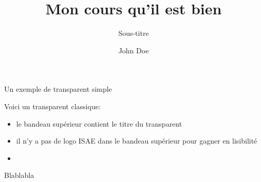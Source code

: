 \documentclass{beamer}
\begin{document}
\title[Petit titre]{Mon cours qu'il est bien}
\subtitle{Sous-titre}
\author{John Doe}
\subject{Slides to present my beamer class for ISAE slides.}
\date{}

\begin{frame}
  \titlepage
\end{frame}


\begin{frame}{Un exemple de transparent simple}

\vfill

Voici un transparent classique:

\begin{itemize}
\item le bandeau supérieur contient le titre du transparent
\item il n'y a pas de logo ISAE dans le bandeau supérieur pour gagner
  en lisibilité
\item 
\end{itemize}


Blablabla

\end{frame}
\end{document}
